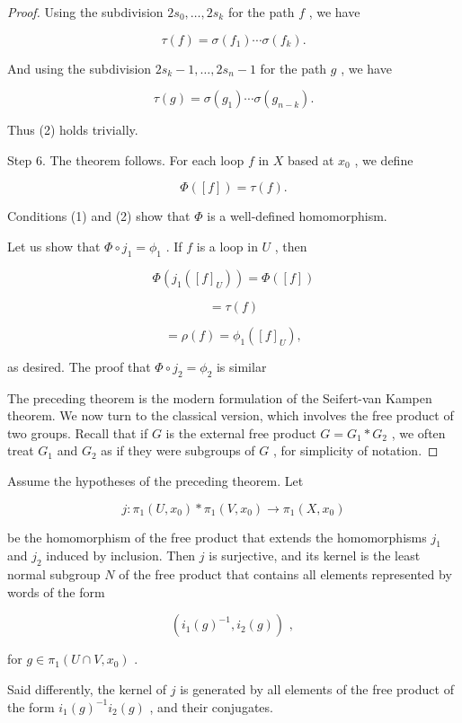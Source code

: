 \begin{proof}
Using the subdivision \(2{s}_{0},\ldots ,2{s}_{k}\) for the path \(f\) , we have

\[
\tau \left( f\right)  = \sigma \left( {f}_{1}\right) \cdots \sigma \left( {f}_{k}\right) .
\]

And using the subdivision \(2{s}_{k} - 1,\ldots ,2{s}_{n} - 1\) for the path \(g\) , we have

\[
\tau \left( g\right)  = \sigma \left( {g}_{1}\right) \cdots \sigma \left( {g}_{n - k}\right) .
\]

Thus (2) holds trivially.

Step 6. The theorem follows. For each loop \(f\) in \(X\) based at \({x}_{0}\) , we define

\[
\Phi \left( \left\lbrack  f\right\rbrack  \right)  = \tau \left( f\right) .
\]

Conditions (1) and (2) show that \(\Phi\) is a well-defined homomorphism.

Let us show that \(\Phi  \circ  {j}_{1} = {\phi }_{1}\) . If \(f\) is a loop in \(U\) , then

\[
\Phi \left( {{j}_{1}\left( {\left\lbrack  f\right\rbrack  }_{U}\right) }\right)  = \Phi \left( \left\lbrack  f\right\rbrack  \right)
\]

\[
= \tau \left( f\right)
\]

\[
= \rho \left( f\right)  = {\phi }_{1}\left( {\left\lbrack  f\right\rbrack  }_{U}\right) ,
\]

as desired. The proof that \(\Phi  \circ  {j}_{2} = {\phi }_{2}\) is similar

The preceding theorem is the modern formulation of the Seifert-van Kampen theorem. We now turn to the classical version, which involves the free product of two groups. Recall that if \(G\) is the external free product \(G = {G}_{1} * {G}_{2}\) , we often treat \({G}_{1}\) and \({G}_{2}\) as if they were subgroups of \(G\) , for simplicity of notation.
\end{proof}
\begin{theorem} Assume the hypotheses of the preceding theorem. Let

\[
j : {\pi }_{1}\left( {U,{x}_{0}}\right)  * {\pi }_{1}\left( {V,{x}_{0}}\right)  \rightarrow  {\pi }_{1}\left( {X,{x}_{0}}\right)
\]

be the homomorphism of the free product that extends the homomorphisms \({j}_{1}\) and \({j}_{2}\) induced by inclusion. Then \(j\) is surjective, and its kernel is the least normal subgroup \(N\) of the free product that contains all elements represented by words of the form

\[
\left( {{i}_{1}{\left( g\right) }^{-1},{i}_{2}\left( g\right) }\right) \text{ , }
\]

for \(g \in  {\pi }_{1}\left( {U \cap  V,{x}_{0}}\right)\) .

Said differently, the kernel of \(j\) is generated by all elements of the free product of the form \({i}_{1}{\left( g\right) }^{-1}{i}_{2}\left( g\right)\) , and their conjugates.
\end{theorem}


